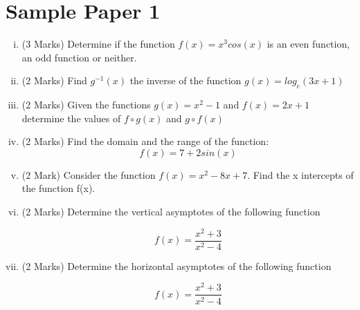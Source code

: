 \documentclass[]{article}
\begin{document}
\section*{Sample Paper 1}
\begin{enumerate}[(i)]
	\item (3 Marks) Determine if the function $f(x) = x^3cos(x)$ is an even function, an odd function or neither.
		\bigskip
	\item (2 Marks) Find $g^{-1} (x)$ the inverse of the function $g(x) = log_e(3x+1)$
	\bigskip
	\item (2 Marks) Given the functions $g(x) = x^2-1$ and $f(x) = 2x+1$ determine the values of $f \circ g(x)$ and $g \circ f(x)$
	
		\bigskip
	\item (2 Marks) Find the domain and the range of the function:
	\[f(x) = 7 + 2 sin (x)\]
		\bigskip
	\item (2 Mark) Consider the function $f(x) = x^2 -8x  + 7$. Find the x intercepts of the function f(x). 
	


\item (2 Marks) Determine the vertical asymptotes of the following function

\[  f(x)  = \frac{x^2+3}{x^2 - 4} \]

\item (2 Marks) Determine the horizontal asymptotes of the following function

\[  f(x)  = \frac{x^2+3}{x^2 - 4} \]


\end{enumerate}
\newpage
\end{document}
